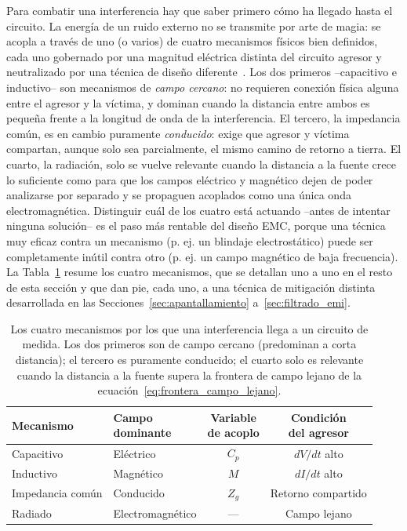 Para combatir una interferencia hay que saber primero cómo ha llegado hasta el circuito. La energía de un ruido externo no se transmite por arte de magia: se acopla a través de uno (o varios) de cuatro mecanismos físicos bien definidos, cada uno gobernado por una magnitud eléctrica distinta del circuito agresor y neutralizado por una técnica de diseño diferente~\cite{ott1988noise,paul2006emc}. Los dos primeros --capacitivo e inductivo-- son mecanismos de \emph{campo cercano}: no requieren conexión física alguna entre el agresor y la víctima, y dominan cuando la distancia entre ambos es pequeña frente a la longitud de onda de la interferencia. El tercero, la impedancia común, es en cambio puramente \emph{conducido}: exige que agresor y víctima compartan, aunque solo sea parcialmente, el mismo camino de retorno a tierra. El cuarto, la radiación, solo se vuelve relevante cuando la distancia a la fuente crece lo suficiente como para que los campos eléctrico y magnético dejen de poder analizarse por separado y se propaguen acoplados como una única onda electromagnética. Distinguir cuál de los cuatro está actuando --antes de intentar ninguna solución-- es el paso más rentable del diseño EMC, porque una técnica muy eficaz contra un mecanismo (p. ej. un blindaje electrostático) puede ser completamente inútil contra otro (p. ej. un campo magnético de baja frecuencia). La Tabla~\ref{tab:mecanismos_acoplamiento} resume los cuatro mecanismos, que se detallan uno a uno en el resto de esta sección y que dan pie, cada uno, a una técnica de mitigación distinta desarrollada en las Secciones~\ref{sec:apantallamiento} a~\ref{sec:filtrado_emi}.

\begin{table}
    \centering
    \begin{tabularx}{\linewidth}{@{}l>{\centering\arraybackslash}Xcc@{}}
        \toprule
        \textbf{Mecanismo} & \shortstack{\textbf{Campo}\\\textbf{dominante}} & \shortstack{\textbf{Variable}\\\textbf{de acoplo}} & \shortstack{\textbf{Condición}\\\textbf{del agresor}} \\
        \midrule
        Capacitivo & Eléctrico & $C_p$ & $dV/dt$ alto \\
        Inductivo & Magnético & $M$ & $dI/dt$ alto \\
        Impedancia común & Conducido & $Z_g$ & Retorno compartido \\
        Radiado & Electromagnético & --- & Campo lejano \\
        \bottomrule
    \end{tabularx}
    \caption[Los cuatro mecanismos de acoplamiento de interferencias.]{Los cuatro mecanismos por los que una interferencia llega a un circuito de medida. Los dos primeros son de campo cercano (predominan a corta distancia); el tercero es puramente conducido; el cuarto solo es relevante cuando la distancia a la fuente supera la frontera de campo lejano de la ecuación~\eqref{eq:frontera_campo_lejano}.\protect\label{tab:mecanismos_acoplamiento}}
\end{table}

